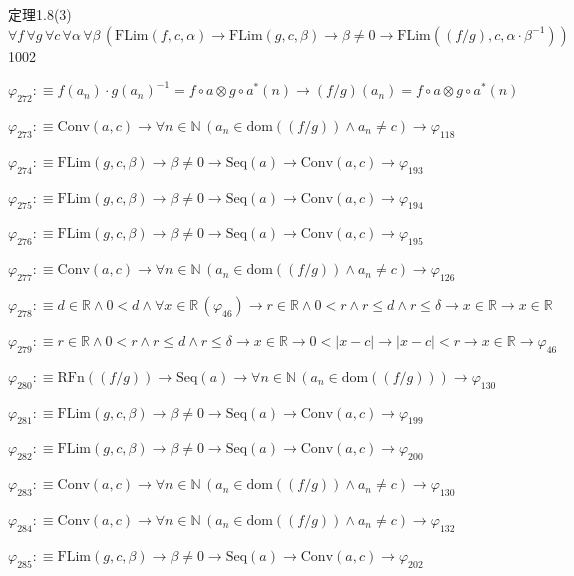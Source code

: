 \begin{fullproof}{定理1.8(3)}{$\forall f\,\forall g\,\forall c\,\forall \alpha\,\forall \beta\,(\mathrm{FLim}(f,c,\alpha) \to \mathrm{FLim}(g,c,\beta) \to \beta \neq 0 \to \mathrm{FLim}((f / g),c,\alpha \cdot \beta^{-1}))$}{1002}
\begin{abbrevlist}
\item $\varphi_{272} :\equiv f(a_{n}) \cdot g(a_{n})^{-1} = f \circ a \otimes g \circ a^{\ast}(n) \to (f / g)(a_{n}) = f \circ a \otimes g \circ a^{\ast}(n)$
\item $\varphi_{273} :\equiv \mathrm{Conv}(a,c) \to \forall n \in \mathbb{N}\,(a_{n} \in \mathrm{dom}((f / g)) \land a_{n} \neq c) \to \varphi_{118}$
\item $\varphi_{274} :\equiv \mathrm{FLim}(g,c,\beta) \to \beta \neq 0 \to \mathrm{Seq}(a) \to \mathrm{Conv}(a,c) \to \varphi_{193}$
\item $\varphi_{275} :\equiv \mathrm{FLim}(g,c,\beta) \to \beta \neq 0 \to \mathrm{Seq}(a) \to \mathrm{Conv}(a,c) \to \varphi_{194}$
\item $\varphi_{276} :\equiv \mathrm{FLim}(g,c,\beta) \to \beta \neq 0 \to \mathrm{Seq}(a) \to \mathrm{Conv}(a,c) \to \varphi_{195}$
\item $\varphi_{277} :\equiv \mathrm{Conv}(a,c) \to \forall n \in \mathbb{N}\,(a_{n} \in \mathrm{dom}((f / g)) \land a_{n} \neq c) \to \varphi_{126}$
\item $\varphi_{278} :\equiv d \in \mathbb{R} \land 0 < d \land \forall x \in \mathbb{R}\,(\varphi_{46}) \to r \in \mathbb{R} \land 0 < r \land r \leq d \land r \leq \delta \to x \in \mathbb{R} \to x \in \mathbb{R}$
\item $\varphi_{279} :\equiv r \in \mathbb{R} \land 0 < r \land r \leq d \land r \leq \delta \to x \in \mathbb{R} \to 0 < \lvert x - c \rvert \to \lvert x - c \rvert < r \to x \in \mathbb{R} \to \varphi_{46}$
\item $\varphi_{280} :\equiv \mathrm{RFn}((f / g)) \to \mathrm{Seq}(a) \to \forall n \in \mathbb{N}\,(a_{n} \in \mathrm{dom}((f / g))) \to \varphi_{130}$
\item $\varphi_{281} :\equiv \mathrm{FLim}(g,c,\beta) \to \beta \neq 0 \to \mathrm{Seq}(a) \to \mathrm{Conv}(a,c) \to \varphi_{199}$
\item $\varphi_{282} :\equiv \mathrm{FLim}(g,c,\beta) \to \beta \neq 0 \to \mathrm{Seq}(a) \to \mathrm{Conv}(a,c) \to \varphi_{200}$
\item $\varphi_{283} :\equiv \mathrm{Conv}(a,c) \to \forall n \in \mathbb{N}\,(a_{n} \in \mathrm{dom}((f / g)) \land a_{n} \neq c) \to \varphi_{130}$
\item $\varphi_{284} :\equiv \mathrm{Conv}(a,c) \to \forall n \in \mathbb{N}\,(a_{n} \in \mathrm{dom}((f / g)) \land a_{n} \neq c) \to \varphi_{132}$
\item $\varphi_{285} :\equiv \mathrm{FLim}(g,c,\beta) \to \beta \neq 0 \to \mathrm{Seq}(a) \to \mathrm{Conv}(a,c) \to \varphi_{202}$

\end{abbrevlist}
\end{fullproof}
